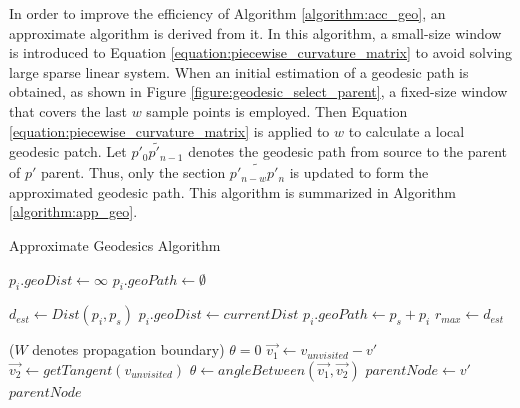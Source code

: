 In order to improve the efficiency of Algorithm \ref{algorithm:acc_geo}, an approximate algorithm is derived from it. In this algorithm, a small-size window is introduced to Equation \ref{equation:piecewise_curvature_matrix} to avoid solving large sparse linear system. When an initial estimation of a geodesic path is obtained, as shown in Figure \ref{figure:geodesic_select_parent}, a fixed-size window that covers the last $w$ sample points is employed. Then Equation \ref{equation:piecewise_curvature_matrix} is applied to $w$ to calculate a local geodesic patch. Let $\widetilde{p'_{0}p'_{n-1}}$ denotes the geodesic path from source to the parent of $p'$ parent. Thus, only the section $\widetilde{ p'_{n-w}p'_{n}}$ is updated to form the approximated geodesic path. This algorithm is summarized in Algorithm \ref{algorithm:app_geo}.


\begin{algorithm}
\caption{Approximate Geodesics Algorithm}\label{algorithm:app_geo}
\begin{algorithmic}[1]
		\State $p_{i}.geoDist \gets \infty$
		\State $p_{i}.geoPath \gets \emptyset$
	\EndFor
\EndProcedure
\item[]
	\State $d_{est} \gets Dist(p_{i},p_{s})$
	\State $p_{i}.geoDist \gets currentDist$
	\State $p_{i}.geoPath \gets p_{s} + p_{i}$
		\State $r_{max} \gets d_{est}$
	\EndIf
	\EndFor
\EndProcedure
\item[]


($W$ denotes propagation boundary)
		\State $\theta = 0$
			\State $\vec{v_1} \gets v_{unvisited} - v'$
			\State $\vec{v_2} \gets getTangent(v_{unvisited})$
				\State $\theta \gets angleBetween(\vec{v_1}, \vec{v_2})$
				\State $parentNode \gets v'$
			\EndIf
		\EndIf
	\EndFor
	\State\Return $parentNode$
\EndFunction
{}
\end{algorithmic}
\end{algorithm}

